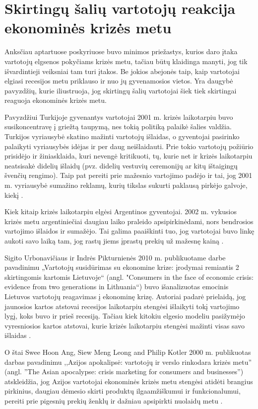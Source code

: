\documentclass[l1pt, titlepage]{article}
\begin{document}
\section{Skirtingų šalių vartotojų reakcija ekonominės krizės metu}
Anksčiau aptartuose poskyriuose buvo minimos priežastys, kurios daro įtaka vartotojų elgsenos pokyčiams krizės metu, tačiau būtų klaidinga manyti, jog tik išvardintieji veiksniai tam turi įtakos. Be jokios abejonės taip, kaip vartotojai elgiasi recesijos metu priklauso ir nuo jų gyvenamosios vietos. Yra daugybė pavyzdžių, kurie iliustruoja, jog skirtingų šalių vartotojai šiek tiek skirtingai reaguoja ekonominės krizės metu. 

Pavyzdžiui Turkijoje gyvenantys vartotojai 2001 m. krizės  laikotarpiu buvo susikoncentravę į griežtą taupymą, nes tokią politiką palaikė šalies valdžia. Turkijos vyriausybė skatino mažinti vartotojų išlaidas, o gyventojai pasirinko palaikyti vyriausybės idėjas ir per daug neišlaidauti. Prie tokio vartotojų požiūrio prisidėjo ir žiniasklaida, kuri nevengė kritikuoti, tų, kurie net ir krizės laikotarpiu neatsisakė didelių išlaidų (pvz. didelių vestuvių ceremonijų ar kitų ištaigingų švenčių rengimo). Taip pat pereiti prie mažesnio vartojimo padėjo ir tai, jog 2001 m. vyriausybė sumažino reklamų, kurių tikslas sukurti paklausą pirkėjo galvoje, kiekį \cite{kaytaz2014consumer}.

Kiek kitaip krizės laikotarpiu elgėsi Argentinos gyventojai.  2002 m. vykusios krizės metu argentiniečiai daugiau laiko praleido apsipirkinėdami, nors bendrosios vartojimo išlaidos ir sumažėjo. Tai galima paaiškinti tuo, jog vartotojai buvo linkę aukoti savo laiką tam, jog rastų jiems įprastų prekių už mažesnę kainą \cite{less2005bureau}.

Sigito Urbonavičiaus ir Indrės Pikturnienės 2010 m. publikuotame darbe pavadinimu „Vartotojų susidūrimas su ekonomine krize: įrodymai remiantis 2 skirtingomis kartomis Lietuvoje“ (angl. "Consumers in the face of economic crisis: evidence from two generations in Lithuania“) buvo išanalizuotas emocinis Lietuvos vartotojų reagavimas į ekonominę krizę. Autoriai padarė prielaidą, jog jaunosios kartos atstovai recesijos laikotarpiu stengėsi išlaikyti tokį vartojimo lygį, koks buvo ir prieš recesiją. Tačiau kiek kitokiu elgesio modeliu pasižymėjo vyresniosios kartos atstovai, kurie krizės laikotarpiu stengėsi mažinti visas savo išlaidas \cite{urbonavivcius2010consumers}. 

O štai Swee  Hoon  Ang,  Siew  Meng  Leong  and  Philip  Kotler 2000 m. publikuotas darbas pavadinimu ,,Azijos apokalipsė: vartotojų ir verslo rinkodara krizės metu” (angl. ”The Asian apocalypse: crisis marketing for consumers and businesses”) atskleidžia, jog Azijos vartotojai ekonominės krizės metu stengėsi atidėti brangius pirkinius, daugiau dėmesio skirti produktų ilgaamžiškumui ir funkcionalumui, pereiti prie pigesnių prekių ženklų ir dažniau apsipirkti nuolaidų metu \cite{ang2000asian}.
\end{document}
